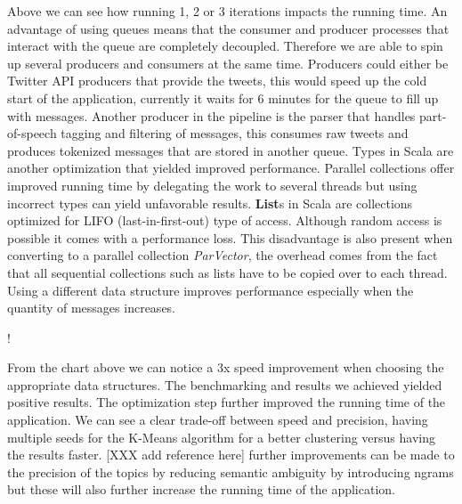 Above we can see how running 1, 2 or 3 iterations impacts the running time.
\newline
An advantage of using queues means that the consumer and producer processes that interact with the queue are completely decoupled. Therefore we are able to spin up several producers and consumers at the same time. Producers could either be Twitter API producers that provide the tweets, this would speed up the cold start of the application, currently it waits for 6 minutes for the queue to fill up with messages. Another producer in the pipeline is the parser that handles part-of-speech tagging and filtering of messages, this consumes raw tweets and produces tokenized messages that are stored in another queue.
\newline
Types in Scala are another optimization that yielded improved performance. Parallel collections offer improved running time by delegating the work to several threads but using incorrect types can yield unfavorable results. \textbf{List}s in Scala are collections optimized for LIFO (last-in-first-out) type of access. Although random access is possible it comes with a performance loss. This disadvantage is also present when converting to a parallel collection \textit{ParVector}, the overhead comes from the fact that all sequential collections such as lists have to be copied over to each thread. Using a different data structure improves performance especially when the quantity of messages increases.

\resizebox {\columnwidth} {!} {
}

From the chart above we can notice a 3x speed improvement when choosing the appropriate data structures.
\newline
\newline
The benchmarking and results we achieved yielded positive results. The optimization step further improved the running time of the application. We can see a clear trade-off between speed and precision, having multiple seeds for the K-Means algorithm for a better clustering versus having the results faster. [XXX add reference here] further improvements can be made to the precision of the topics by reducing semantic ambiguity by introducing ngrams but these will also further increase the running time of the application.

